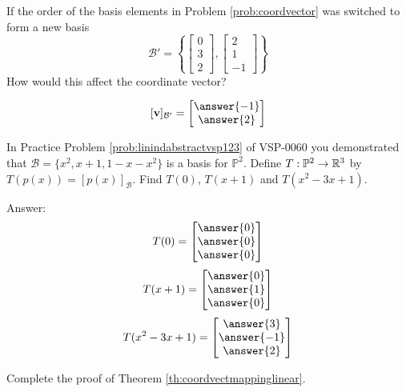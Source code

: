 \documentclass{ximera}
\begin{document}
\begin{problem}\label{prob:switchbasisorder}
If the order of the basis elements in Problem \ref{prob:coordvector} was switched to form a new basis
$$\mathcal{B}'=\left\{\begin{bmatrix}0\\3\\2\end{bmatrix}, \begin{bmatrix}2\\1\\-1\end{bmatrix} \right\}$$
How would this affect the coordinate vector?

$$[\vec{v}]_{\mathcal{B}'}=\begin{bmatrix}\answer{-1}\\\answer{2}\end{bmatrix}$$
\end{problem}



\begin{problem}\label{prob:polylintranscoordvect} In Practice Problem \ref{prob:linindabstractvsp123} of VSP-0060 you demonstrated that
$\mathcal{B}=\{x^{2}, x + 1, 1 - x - x^{2}\}$ is a basis for $\mathbb{P}^2$.  Define $T:\mathbb{P}^2\rightarrow \mathbb{R}^3$ by $T(p(x))=[p(x)]_{\mathcal{B}}$.  Find $T(0)$, $T(x+1)$ and $T(x^2-3x+1)$.

Answer:
$$T(0)=\begin{bmatrix}\answer{0}\\\answer{0}\\\answer{0}\end{bmatrix}$$
$$T(x+1)=\begin{bmatrix}\answer{0}\\\answer{1}\\\answer{0}\end{bmatrix}$$
$$T(x^2-3x+1)=\begin{bmatrix}\answer{3}\\\answer{-1}\\\answer{2}\end{bmatrix}$$
\end{problem}

\begin{problem}\label{prob:completeproofoflin}
Complete the proof of Theorem \ref{th:coordvectmappinglinear}.
\end{problem}
\end{document}
